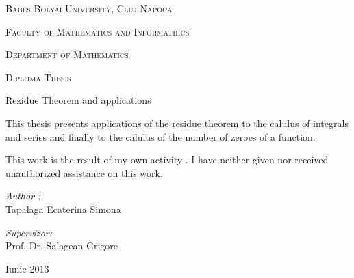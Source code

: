 \documentclass[12pt,a4paper]{article}
\begin{document}
 \begin{center}
    { \textsc{Babes-Bolyai University, Cluj-Napoca} \par
            \textsc{Faculty of Mathematics and Informathics} \par
            \textsc{Department of Mathematics} \par }

    \vfill

    {\LARGE \textsc{Diploma Thesis}}
    \null\vskip 1cm

    {\huge{Rezidue Theorem and applications \par }}

    \vfill

    {
    \begin{flushleft}
        This thesis presents applications of the residue theorem to the 
      calulus of integrals and series and finally to the calulus of the number of zeroes of a function.
    \end{flushleft}
    }

    \vfill

    {
    \begin{flushleft}
        This work is the result of my own activity . I have neither given nor received unauthorized assistance on this work.
    \end{flushleft}
    }

    \vfill

    \begin{minipage}[b]{0.51\linewidth}
        {\large \emph{Author :}\\
            Tapalaga Ecaterina Simona}
    \end{minipage}
    \begin{minipage}[b]{0.48\linewidth}
        \begin{flushright}
            {\large \emph{Supervizor:}\\
                Prof. Dr. Salagean Grigore}
        \end{flushright}
     \end{minipage}

    \vfill
    {\large \par Iunie 2013 \par}
    \end{center}
\end{document}
